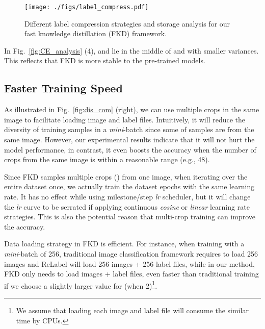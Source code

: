 \documentclass[10pt,twocolumn,letterpaper]{article}
\begin{document}
\begin{figure}[t]
  \centering
  \texttt{[image: ./figs/label\_compress.pdf]}
  \vspace{-0.25in}
  \caption{Different label compression strategies and storage analysis for our fast knowledge distillation (FKD) framework.} 
  \label{fig:dis_label_compress}
  \vspace{-0.15in}
\end{figure}


In Fig.~\ref{fig:CE_analysis} (4),  and  lie in the middle of  and  with smaller variances. This reflects that FKD is more stable to the pre-trained models.

\subsection{Faster Training Speed} \label{FTS}
 As illustrated in Fig.~\ref{fig:dis_com} (right), we can use multiple crops in the same image to facilitate loading image and label files. Intuitively, it will reduce the diversity of training samples in a {\em mini}-batch since some of samples are from the same image. However, our experimental results indicate that it will not hurt the model performance, in contrast, it even boosts the accuracy when the number of crops from the same image is within a reasonable range (e.g., 48). 

 Since FKD samples multiple crops () from one image, when iterating over the entire dataset once, we actually train the dataset  epochs with the same learning rate. It has no effect while using milestone/step {\em lr} scheduler, but it will change the {\em lr} curve to be serrated if applying continuous {\em cosine} or {\em linear} learning rate strategies. This is also the potential reason that multi-crop training can improve the accuracy.


Data loading strategy in FKD is efficient. For instance, when training with a {\em mini}-batch of 256, traditional image classification framework requires to load 256 images and ReLabel will load 256 images + 256 label files, while in our method, FKD only needs to load  images +  label files, even faster than traditional training if we choose a slightly larger value for  (when 2)\footnote{We assume that loading each image and label file will consume the similar time by CPUs.}.
\end{document}
